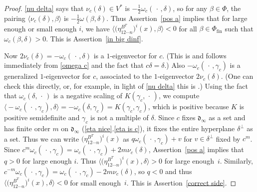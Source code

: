 \documentclass{amsart}
\theoremstyle{definition}
\theoremstyle{remark}
\numberwithin{equation}{section}
\newcommand{\br}[1]{{\langle #1 \rangle}}
\newcommand{\brr}[1]{{\bigl\langle #1 \bigr\rangle}}
\newcommand{\0}{{\mathbf{0}}}
\renewcommand{\d}{{\mathfrak d}}
\newcommand{\fin}{\mathrm{fin}}
\newcommand{\RSChar}{\Phi}
\newcommand{\RS}{\RSChar}
\newcommand{\RSfin}{\RS_\fin}
\begin{document}
\begin{proof}
\cref{nu delta} says that $\nu_c(\delta)\in V^*$ is $-\frac12\omega_c(\,\cdot\,,\delta)$, so for any $\beta\in\RS$, the pairing $\br{\nu_c(\delta),\beta}$ is $-\frac12\omega(\beta,\delta)$.
Thus Assertion~\ref{pos a} implies that for large enough or small enough $i$, we have $\brr{\bigl(\eta_{12\cdots n}^{B^T}\bigr)^i(x),\beta}<0$ for all $\beta\in\RSfin$ such that $\omega_c(\beta,\delta)>0$.
This is Assertion~\ref{in big dinf}.  

Now $2\nu_c(\delta)=-\omega_c(\,\cdot\,,\delta)$ is a $1$-eigenvector for $c$.
(This is \cite[Lemma~3.5]{afforb} and follows immediately from \cref{omega c} and the fact that $c\delta=\delta$.)
Also $-\omega_c(\,\cdot\,,\gamma_c)$ is a generalized $1$-eigenvector for $c$, associated to the $1$-eigenvector $2\nu_c(\delta)$.
(One can check this directly, or, for example, in light of \cref{nu delta} this is \cite[Lemma~2.8]{affncA}.)
Using the fact \cite[Lemma~3.5]{afforb} that $\omega_c(\delta,\,\cdot\,)$ is a negative scaling of $K(\gamma_c,\,\cdot\,)$, we compute $\brr{-\omega_c(\,\cdot\,,\gamma_c),\delta}=-\omega_c(\delta,\gamma_c)=K(\gamma_c,\gamma_c)$, which is positive because $K$ is positive semidefinite and $\gamma_c$ is not a multiple of $\delta$.
Since $c$ fixes $\d_\infty$ as a set and has finite order $m$ on $\d_\infty$ (\cref{eta nice}.\ref{eta is c}), it fixes the entire hyperplane $\delta^\perp$ as a set.
Thus we can write $\bigl(\eta_{12\cdots n}^{B^T}\bigr)^i(x)$ as $q\omega_c(\,\cdot\,,\gamma_c)+v$ for $v\in\delta^\perp$ fixed by $c^m$.
Since $c^m\omega_c(\,\cdot\,,\gamma_c)=\omega_c(\,\cdot\,,\gamma_c)+2m\nu_c(\delta)$, Assertion~\ref{pos a} implies that $q>0$ for large enough $i$.
Thus $\brr{\bigl(\eta_{12\cdots n}^{B^T}\bigr)^i(x),\delta}>0$ for large enough~$i$.
  Similarly, $c^{-m}\omega_c(\,\cdot\,,\gamma_c)=\omega_c(\,\cdot\,,\gamma_c)-2m\nu_c(\delta)$, so $q<0$ and thus $\brr{\bigl(\eta_{12\cdots n}^{B^T}\bigr)^i(x),\delta}<0$ for small enough~$i$.
This is Assertion~\ref{correct side}.
\end{proof}
\end{document}
